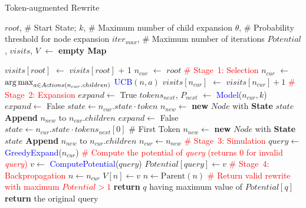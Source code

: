 {
\begin{algorithm}[!h]
\caption{Token-augmented Rewrite}
\label{alg:mcts_full}
\begin{algorithmic}[1]
\footnotesize
\REQUIRE 
\Statex $root$, \hspace{0.73cm} \# Start State; 
\Statex $k$, \hspace{1.1cm} \# Maximum number of child expansion
\Statex $\theta$, \hspace{1.1cm} \# Probability threshold for node expansion
\Statex $iter_{max}$, \hspace{0.28cm} \# Maximum number of iterations
\State $Potential$, $visits$, $V$ $\gets$ \textbf{empty Map}

    \State $visits[root]$ $\gets$ $visits[root]$ + 1
    \State $n_{cur}$ $\gets$ $root$
    \State\textcolor{red}{\# Stage~1: Selection}
        \State $n_{cur}$ $\gets$ $\operatorname*{arg\,max}_{a \in Actions(n_{cur}.children)}$ \textcolor{blue}{UCB}$(n, a)$
        \State $visits[n_{cur}]$ $\gets$ $visits[n_{cur}] + 1$
    \EndWhile
    \State\textcolor{red}{\# Stage~2: Expansion}
    \State $expand \gets$  True
        \State $tokens_{next}$, $P_{next}$ $\gets$ \textcolor{blue}{Model}($n_{cur},k$)
            \State $expand \gets$ False
                \State $state \gets n_{cur}.state \cdot token$
                \State $n_{new} \gets$ \textbf{new} $Node$ with \textbf{State} $state$
                \State \textbf{Append} $n_{new}$ to $n_{cur}.children$
            \EndFor
            \State $expand \gets$  False
        \Else
            \State $state \gets n_{cur}.state \cdot tokens_{next}[0]$ \# First Token
            \State $n_{new} \gets$ \textbf{new} $Node$ with \textbf{State} $state$
            \State \textbf{Append} $n_{new}$ to $n_{cur}.children$
            \State $n_{cur} \gets n_{new}$
        \EndIf
    \EndWhile
    \State\textcolor{red}{\# Stage~3: Simulation}
    \State $query \gets$ \textcolor{blue}{GreedyExpand}($n_{cur}$)
    \State\textcolor{red}{\# Compute the potential of  \textit{query} (returns 0 for invalid \textit{query})}
    \State $v \gets$ \textcolor{blue}{ComputePotential}($query$)
    \State $Potential[query] \gets v$
    \State\textcolor{red}{\# Stage~4: Backpropagation}
    \State $n \gets n_{cur}$
            \State $V[n] \gets v$
        \EndIf
        \State $n \gets \text{Parent}(n)$
    \EndWhile
\EndFor
\State\textcolor{red}{\# Return valid rewrite with maximum $Potential > 1$}
    \State \textbf{return} $q$ having maximum value of $Potential[q]$
\Else
    \State \textbf{return} the original query
\EndIf
\end{algorithmic}
\end{algorithm}
}

